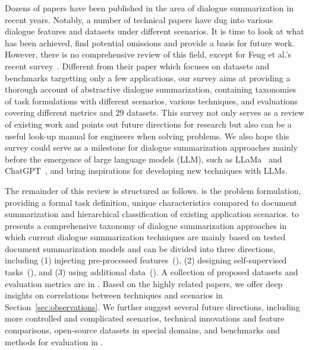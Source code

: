 

Dozens of papers have been published in the area of dialogue summarization in recent years. 
Notably, a number of technical papers have dug into various dialogue features and datasets under different scenarios. 
It is time to look at what has been achieved, find potential omissions and provide a basis for future work.
However, there is no comprehensive review of this field, except for Feng et al.'s recent survey~\cite{feng2021survey}. 
Different from their paper which focuses on datasets and benchmarks targetting only a few applications, 
our survey aims at providing a thorough account of abstractive dialogue summarization, containing taxonomies of task formulations with different scenarios, various techniques, and evaluations covering different metrics and $29$ datasets.
This survey not only serves as a review of existing work and points out future directions for research but also can be a useful look-up manual 
for engineers when solving problems. We also hope this survey could serve as a milestone for dialogue summarization approaches mainly before the emergence of large language models (LLM), such as LLaMa~\cite{touvron2023llama} and ChatGPT~\cite{openai2022}, and bring inspirations for developing new techniques with LLMs.


The remainder of this review is structured as follows.  is the problem formulation, providing a formal task definition, 
unique characteristics compared to document summarization and hierarchical classification of existing application scenarios.
 to  presents a comprehensive taxonomy of dialogue summarization approaches in which current dialogue 
summarization techniques are mainly based on tested document summarization models and can be divided into 
three directions, including (1) injecting pre-processed features~(), (2) designing self-supervised tasks~(), and 
(3) using additional data~().
A collection of proposed datasets and evaluation metrics are in .
Based on the highly related papers, 
we offer deep insights on correlations between techniques and scenarios in Section~\ref{sec:observations}. 
We further suggest several future directions, including more controlled and complicated 
scenarios, technical innovations and feature comparisons, open-source datasets in special domains, 
and benchmarks and methods for evaluation in .

